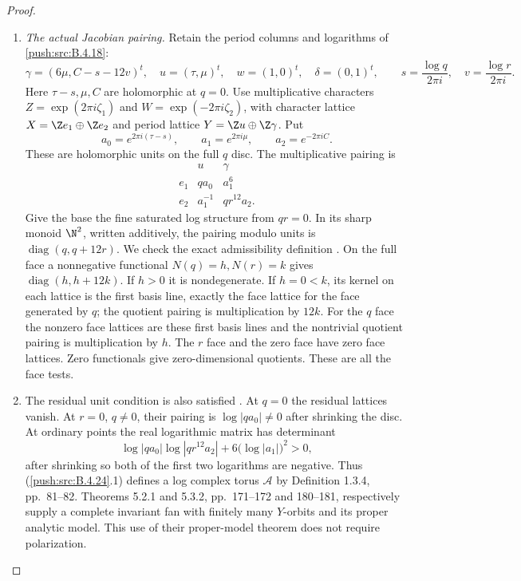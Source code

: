 \begin{proof}
\begin{enumerate}[label=\arabic*.,leftmargin=*]
\item \emph{The actual Jacobian pairing.}
Retain the period columns and logarithms of \ref{push:src:B.4.18}:
\[
 \gamma=(6\mu,C-s-12v)^t,\quad
 u=(\tau,\mu)^t,\quad w=(1,0)^t,\quad\delta=(0,1)^t,
 \qquad
 s=\frac{\log q}{2\pi i},\quad
 v=\frac{\log r}{2\pi i}.
\]
Here $\tau-s,\mu,C$ are holomorphic at $q=0$.
Use multiplicative characters
$Z=\exp(2\pi i\zeta_1)$ and
$W=\exp(-2\pi i\zeta_2)$, with character lattice
$X=\Z e_1\oplus\Z e_2$ and period lattice
$Y=\Z u\oplus\Z\gamma$. Put
\[
 a_0=e^{2\pi i(\tau-s)},\qquad
 a_1=e^{2\pi i\mu},\qquad a_2=e^{-2\pi iC}.
\]
These are holomorphic units on the full $q$ disc.
The multiplicative pairing is
\[
 \begin{array}{c|cc}
       &u&\gamma\\\hline
 e_1&q a_0&a_1^6\\
 e_2&a_1^{-1}&q r^{12}a_2.
 \end{array}
 \tag{B.4.24.1}
\]
Give the base the fine saturated log structure from
$qr=0$. In its sharp monoid $\N^2$, written additively,
the pairing modulo units is $\operatorname{diag}(q,q+12r)$.
We check the exact admissibility definition
\citep[Definition 1.2.3, pp.~77--78]{KKN2008Root}.
On the full face a nonnegative functional
$N(q)=h,N(r)=k$ gives
$\operatorname{diag}(h,h+12k)$. If $h>0$ it is
nondegenerate. If $h=0<k$, its kernel on each lattice
is the first basis line, exactly the face lattice
for the face generated by $q$; the quotient pairing
is multiplication by $12k$. For the $q$ face the
nonzero face lattices are these first basis lines
and the nontrivial quotient pairing is multiplication
by $h$. The $r$ face and the zero face have zero
face lattices. Zero functionals give zero-dimensional
quotients. These are all the face tests.

\item The residual unit condition is also satisfied
\citep[Definition 1.2.6, p.~79]{KKN2008Root}.
At $q=0$ the residual lattices vanish. At $r=0$,
$q\ne0$, their pairing is $\log|q a_0|\ne0$ after
shrinking the disc. At ordinary points the real
logarithmic matrix has determinant
\[
 \log|q a_0|\log|q r^{12}a_2|
                 +6\bigl(\log|a_1|\bigr)^2>0,
\]
after shrinking so both of the first two logarithms
are negative. Thus (\ref{push:src:B.4.24}.1) defines a log complex
torus $\mathcal A$ by Definition 1.3.4, pp.~81--82.
Theorems 5.2.1 and 5.3.2, pp.~171--172 and 180--181,
respectively supply a complete invariant fan with
finitely many $Y$-orbits and its proper analytic
model. This use of their proper-model theorem does
not require polarization.


\end{enumerate}
\end{proof}
